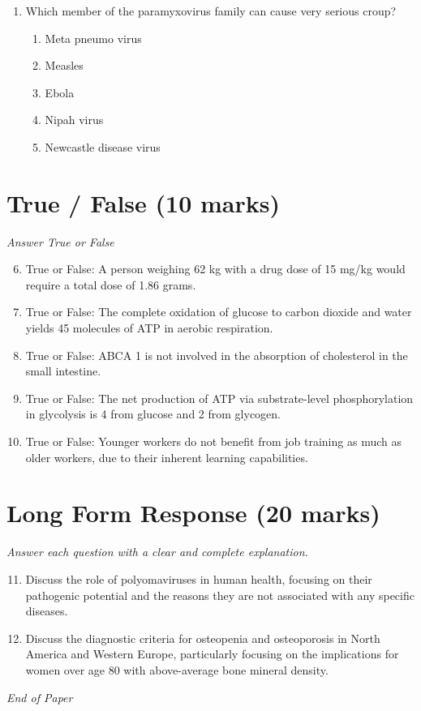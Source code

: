 \documentclass[12pt]{article}
\begin{document}
\begin{enumerate}[label=\arabic*.]
\begin{enumerate}[label=(\alph*)]
    \item Physiological
    \item Behavioral
    \item Biological
    \item Anthropological
    \item Environmental
\end{enumerate}
\item Which member of the paramyxovirus family can cause very serious croup?
\begin{enumerate}[label=(\alph*)]
    \item Meta pneumo virus
    \item Measles
    \item Ebola
    \item Nipah virus
    \item Newcastle disease virus
\end{enumerate}
\end{enumerate}

\section*{True / False (10 marks)}
\textit{Answer True or False}
\begin{enumerate}[label=\arabic*.]
\setcounter{enumi}{5}
\item True or False: A person weighing 62 kg with a drug dose of 15 mg/kg would require a total dose of 1.86 grams.
\item True or False: The complete oxidation of glucose to carbon dioxide and water yields 45 molecules of ATP in aerobic respiration.
\item True or False: ABCA 1 is not involved in the absorption of cholesterol in the small intestine.
\item True or False: The net production of ATP via substrate-level phosphorylation in glycolysis is 4 from glucose and 2 from glycogen.
\item True or False: Younger workers do not benefit from job training as much as older workers, due to their inherent learning capabilities.
\end{enumerate}

\section*{Long Form Response (20 marks)}
\textit{Answer each question with a clear and complete explanation.}
\begin{enumerate}[label=\arabic*.]
\setcounter{enumi}{10}
\item Discuss the role of polyomaviruses in human health, focusing on their pathogenic potential and the reasons they are not associated with any specific diseases.
\item Discuss the diagnostic criteria for osteopenia and osteoporosis in North America and Western Europe, particularly focusing on the implications for women over age 80 with above-average bone mineral density.
\end{enumerate}

\vfill
\noindent\textit{End of Paper}
\end{document}
